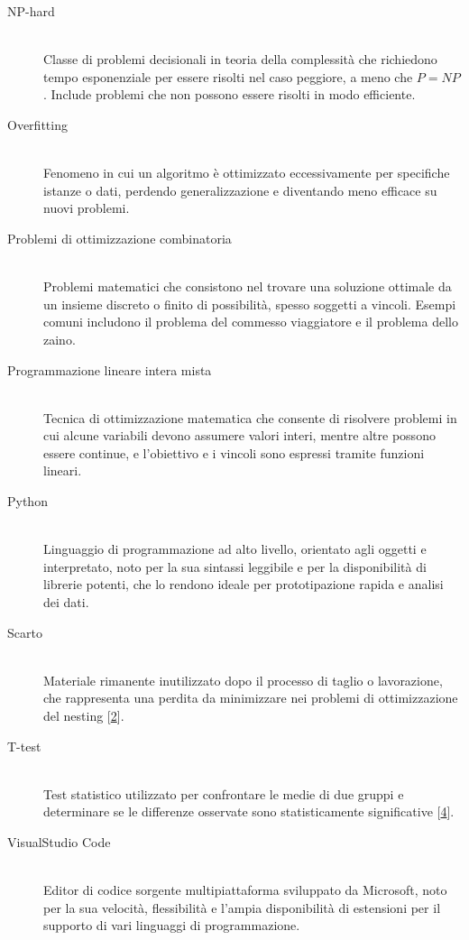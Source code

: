 \begin{description}
    \item[NP-hard] \hfill \\
    Classe di problemi decisionali in teoria della complessità che richiedono tempo esponenziale per essere risolti nel caso peggiore, a meno che $P=NP$. Include problemi che non possono essere risolti in modo efficiente.

    \item[Overfitting] \hfill \\
    Fenomeno in cui un algoritmo è ottimizzato eccessivamente per specifiche istanze o dati, perdendo generalizzazione e diventando meno efficace su nuovi problemi.

    \item[Problemi di ottimizzazione combinatoria] \hfill \\
    Problemi matematici che consistono nel trovare una soluzione ottimale da un insieme discreto o finito di possibilità, spesso soggetti a vincoli. Esempi comuni includono il problema del commesso viaggiatore e il problema dello zaino.

    \item[Programmazione lineare intera mista] \hfill \\
    Tecnica di ottimizzazione matematica che consente di risolvere problemi in cui alcune variabili devono assumere valori interi, mentre altre possono essere continue, e l'obiettivo e i vincoli sono espressi tramite funzioni lineari.

    \item[Python] \hfill \\
    Linguaggio di programmazione ad alto livello, orientato agli oggetti e interpretato, noto per la sua sintassi leggibile e per la disponibilità di librerie potenti, che lo rendono ideale per prototipazione rapida e analisi dei dati.

    \item[Scarto] \hfill \\
    Materiale rimanente inutilizzato dopo il processo di taglio o lavorazione, che rappresenta una perdita da minimizzare nei problemi di ottimizzazione del nesting [\hyperlink{bibliografia}{2}].

    \item[T-test] \hfill \\ \hypertarget{gls4}{}
    Test statistico utilizzato per confrontare le medie di due gruppi e determinare se le differenze osservate sono statisticamente significative [\hyperlink{bibliografia}{4}].

    \item[VisualStudio Code] \hfill \\
    Editor di codice sorgente multipiattaforma sviluppato da Microsoft, noto per la sua velocità, flessibilità e l'ampia disponibilità di estensioni per il supporto di vari linguaggi di programmazione.
\end{description}

